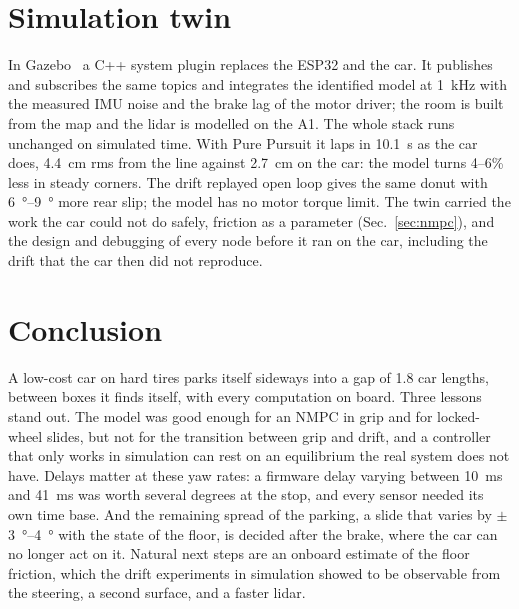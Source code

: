 \documentclass[conference]{IEEEtran}
\begin{document}
\section{Simulation twin}\label{sec:sim}

In Gazebo~\cite{koenig2004} a C++ system plugin replaces the ESP32 and the car. It publishes and subscribes the same
topics and integrates the identified model at \SI{1}{kHz} with the measured IMU noise and the brake lag of the
motor driver; the room is built from the map and the lidar is modelled on the A1. The whole stack runs unchanged on
simulated time. With Pure Pursuit it laps in \SI{10.1}{s} as the car does, \SI{4.4}{cm} rms from the line against
\SI{2.7}{cm} on the car: the model turns 4--6\% less in steady corners. The drift replayed open loop gives the same
donut with \SIrange{6}{9}{\degree} more rear slip; the model has no motor torque limit. The twin carried the work
the car could not do safely, friction as a parameter (Sec.~\ref{sec:nmpc}), and the design and debugging of every
node before it ran on the car, including the drift that the car then did not reproduce.

\section{Conclusion}

A low-cost car on hard tires parks itself sideways into a gap of 1.8 car lengths, between boxes it finds itself,
with every computation on board. Three lessons stand out. The model was good enough for an NMPC in grip and for
locked-wheel slides, but not for the transition between grip and drift, and a controller that only works in
simulation can rest on an equilibrium the real system does not have. Delays matter at these yaw rates: a firmware
delay varying between \SI{10}{ms} and \SI{41}{ms} was worth several degrees at the stop, and every sensor needed its
own time base. And
the remaining spread of the parking, a slide that varies by $\pm$\SIrange{3}{4}{\degree} with the state of the floor, is
decided after the brake, where the car can no longer act on it. Natural next steps are an onboard estimate of the
floor friction, which the drift experiments in simulation showed to be observable from the steering, a second
surface, and a faster lidar.



\end{document}
